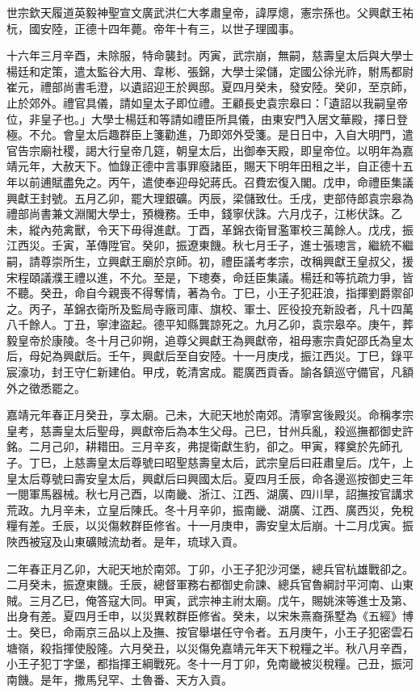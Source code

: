 
\begin{pinyinscope}
世宗欽天履道英毅神聖宣文廣武洪仁大孝肅皇帝，諱厚熜，憲宗孫也。父興獻王祐杬，國安陸，正德十四年薨。帝年十有三，以世子理國事。

十六年三月辛酉，未除服，特命襲封。丙寅，武宗崩，無嗣，慈壽皇太后與大學士楊廷和定策，遣太監谷大用、韋彬、張錦，大學士梁儲，定國公徐光祚，駙馬都尉崔元，禮部尚書毛澄，以遺詔迎王於興邸。夏四月癸未，發安陸。癸卯，至京師，止於郊外。禮官具儀，請如皇太子即位禮。王顧長史袁宗皋曰：「遺詔以我嗣皇帝位，非皇子也。」大學士楊廷和等請如禮臣所具儀，由東安門入居文華殿，擇日登極。不允。會皇太后趣群臣上箋勸進，乃即郊外受箋。是日日中，入自大明門，遣官告宗廟社稷，謁大行皇帝几筵，朝皇太后，出御奉天殿，即皇帝位。以明年為嘉靖元年，大赦天下。恤錄正德中言事罪廢諸臣，賜天下明年田租之半，自正德十五年以前逋賦盡免之。丙午，遣使奉迎母妃蔣氏。召費宏復入閣。戊申，命禮臣集議興獻王封號。五月乙卯，罷大理銀礦。丙辰，梁儲致仕。壬戌，吏部侍郎袁宗皋為禮部尚書兼文淵閣大學士，預機務。壬申，錢寧伏誅。六月戊子，江彬伏誅。乙未，縱內苑禽獸，令天下毋得進獻。丁酉，革錦衣衛冒濫軍校三萬餘人。戊戌，振江西災。壬寅，革傳陞官。癸卯，振遼東饑。秋七月壬子，進士張璁言，繼統不繼嗣，請尊崇所生，立興獻王廟於京師。初，禮臣議考孝宗，改稱興獻王皇叔父，援宋程頤議濮王禮以進，不允。至是，下璁奏，命廷臣集議。楊廷和等抗疏力爭，皆不聽。癸丑，命自今親喪不得奪情，著為令。丁巳，小王子犯莊浪，指揮劉爵禦卻之。丙子，革錦衣衛所及監局寺廠司庫、旗校、軍士、匠役投充新設者，凡十四萬八千餘人。丁丑，寧津盜起。德平知縣龔諒死之。九月乙卯，袁宗皋卒。庚午，葬毅皇帝於康陵。冬十月己卯朔，追尊父興獻王為興獻帝，祖母憲宗貴妃邵氏為皇太后，母妃為興獻后。壬午，興獻后至自安陸。十一月庚戌，振江西災。丁巳，錄平宸濠功，封王守仁新建伯。甲戌，乾清宮成。罷廣西貢香。諭各鎮巡守備官，凡額外之徵悉罷之。

嘉靖元年春正月癸丑，享太廟。己未，大祀天地於南郊。清寧宮後殿災。命稱孝宗皇考，慈壽皇太后聖母，興獻帝后為本生父母。己巳，甘州兵亂，殺巡撫都御史許銘。二月己卯，耕耤田。三月辛亥，弗提衛獻生豹，卻之。甲寅，釋奠於先師孔子。丁巳，上慈壽皇太后尊號曰昭聖慈壽皇太后，武宗皇后曰莊肅皇后。戊午，上皇太后尊號曰壽安皇太后，興獻后曰興國太后。夏四月壬辰，命各邊巡按御史三年一閱軍馬器械。秋七月己酉，以南畿、浙江、江西、湖廣、四川旱，詔撫按官講求荒政。九月辛未，立皇后陳氏。冬十月辛卯，振南畿、湖廣、江西、廣西災，免稅糧有差。壬辰，以災傷敕群臣修省。十一月庚申，壽安皇太后崩。十二月戊寅。振陜西被寇及山東礦賊流劫者。是年，琉球入貢。

二年春正月乙卯，大祀天地於南郊。丁卯，小王子犯沙河堡，總兵官杭雄戰卻之。二月癸未，振遼東饑。壬辰，總督軍務右都御史俞諫、總兵官魯綱討平河南、山東賊。三月乙巳，俺答寇大同。甲寅，武宗神主祔太廟。戊午，賜姚淶等進士及第、出身有差。夏四月壬申，以災異敕群臣修省。癸未，以宋朱熹裔孫墅為《五經》博士。癸巳，命兩京三品以上及撫、按官舉堪任守令者。五月庚午，小王子犯密雲石塘嶺，殺指揮使殷隆。六月癸丑，以災傷免嘉靖元年天下稅糧之半。秋八月辛酉，小王子犯丁字堡，都指揮王綱戰死。冬十一月丁卯，免南畿被災稅糧。己丑，振河南饑。是年，撒馬兒罕、土魯番、天方入貢。


\end{pinyinscope}

